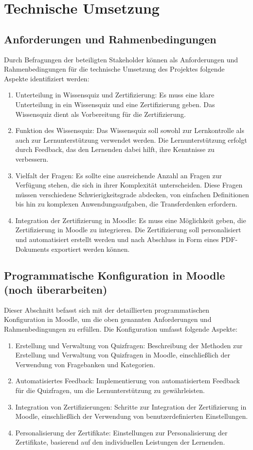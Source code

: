 \chapter{Technische Umsetzung}
\section{Anforderungen und Rahmenbedingungen}
Durch Befragungen der beteiligten Stakeholder können als Anforderungen 
und Rahmenbedingungen für die technische Umsetzung des Projektes 
folgende Aspekte identifiziert werden:
\begin{enumerate}
    \item Unterteilung in Wissensquiz und Zertifizierung: Es muss eine klare Unterteilung in ein Wissensquiz und eine Zertifizierung geben. Das Wissensquiz dient als Vorbereitung für die Zertifizierung.
    \item Funktion des Wissensquiz: Das Wissensquiz soll sowohl zur Lernkontrolle als auch zur Lernunterstützung verwendet werden. Die Lernunterstützung erfolgt durch Feedback, das den Lernenden dabei hilft, ihre Kenntnisse zu verbessern.
    \item Vielfalt der Fragen: Es sollte eine ausreichende Anzahl an Fragen zur Verfügung stehen, die sich in ihrer Komplexität unterscheiden. Diese Fragen müssen verschiedene Schwierigkeitsgrade abdecken, von einfachen Definitionen bis hin zu komplexen Anwendungsaufgaben, die Transferdenken erfordern.    
    \item Integration der Zertifizierung in Moodle: Es muss eine Möglichkeit geben, die Zertifizierung in Moodle zu integrieren. Die Zertifizierung soll personalisiert und automatisiert erstellt werden und nach Abschluss in Form eines PDF-Dokuments exportiert werden können.
\end{enumerate}
\section{Programmatische Konfiguration in Moodle \color{red} (noch überarbeiten)}
Dieser Abschnitt befasst sich mit der detaillierten programmatischen Konfiguration in Moodle, um die oben genannten Anforderungen und Rahmenbedingungen zu erfüllen. Die Konfiguration umfasst folgende Aspekte:
\begin{enumerate}
    \item Erstellung und Verwaltung von Quizfragen: Beschreibung der Methoden zur Erstellung und Verwaltung von Quizfragen in Moodle, einschließlich der Verwendung von Fragebanken und Kategorien.
    \item Automatisiertes Feedback: Implementierung von automatisiertem Feedback für die Quizfragen, um die Lernunterstützung zu gewährleisten.
    \item Integration von Zertifizierungen: Schritte zur Integration der Zertifizierung in Moodle, einschließlich der Verwendung von benutzerdefinierten Einstellungen.
    \item Personalisierung der Zertifikate: Einstellungen zur Personalisierung der Zertifikate, basierend auf den individuellen Leistungen der Lernenden.
\end{enumerate}
